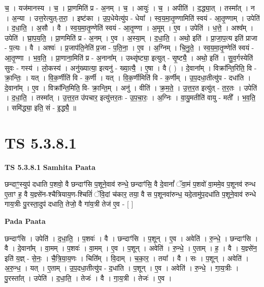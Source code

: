 \documentclass[17pt]{extarticle}
\begin{document}
च॒ । यज॑मानस्य । च॒ । प्रा॒णमिति॑ प्र - अ॒नम् । च॒ । आयुः॑ । च॒ । अपीति॑ । द॒द्ध्या॒त् । तस्मा᳚त् । न । अ॒न्या । उत्त॒रेत्युत्-त॒रा॒ । इष्ट॑का । उ॒प॒धेयेत्यु॑प - धेया᳚ । स्व॒य॒मा॒तृ॒ण्णामिति॑ स्वयं - आ॒तृ॒ण्णाम् । उपेति॑ । द॒धा॒ति॒ । अ॒सौ । वै । स्व॒य॒मा॒तृ॒ण्णेति॑ स्वयं - आ॒तृ॒ण्णा । अ॒मूम् । ए॒व । उपेति॑ । ध॒त्ते॒ । अश्व᳚म् । उपेति॑ । घ्रा॒प॒य॒ति॒ । प्रा॒णमिति॑ प्र - अ॒नम् । ए॒व । अ॒स्या॒म् । द॒धा॒ति॒ । अथो॒ इति॑ । प्रा॒जा॒प॒त्य इति॑ प्राजा - प॒त्यः । वै । अश्वः॑ । प्र॒जाप॑ति॒नेति॑ प्र॒जा - प॒ति॒ना॒ । ए॒व । अ॒ग्निम् । चि॒नु॒ते॒ । स्व॒य॒मा॒तृ॒ण्णेति॑ स्वयं - आ॒तृ॒ण्णा । भ॒व॒ति॒ । प्रा॒णाना॒मिति॑ प्र - अ॒नाना᳚म् । उथ्सृ॑ष्ट्या॒ इत्युत् - सृ॒ष्ट्यै॒ । अथो॒ इति॑ । सु॒व॒र्गस्येति॑ सुवः - गस्य॑ । लो॒कस्य॑ । अनु॑ख्यात्या॒ इत्यनु॑ - ख्या॒त्यै॒ । ए॒षा । वै ( ) । दे॒वाना᳚म् । विक्रा᳚न्ति॒रिति॒ वि - क्रा॒न्तिः॒ । यत् । वि॒क॒र्णीति॑ वि - क॒र्णी । यत् । वि॒क॒र्णीमिति॑ वि - क॒र्णीम् । उ॒प॒दधा॒तीत्यु॑प - दधा॑ति । दे॒वाना᳚म् । ए॒व । विक्रा᳚न्ति॒मिति॒ वि- क्रा॒न्ति॒म् । अनु॑ । वीति॑ । क्र॒म॒ते॒ । उ॒त्त॒र॒त इत्यु॑त् - त॒र॒तः । उपेति॑ । द॒धा॒ति॒ । तस्मा᳚त् । उ॒त्त॒र॒त उ॑पचार॒ इत्यु॑त्तर॒तः - उ॒प॒चा॒रः॒ । अ॒ग्निः । वा॒यु॒मतीति॑ वायु - मती᳚ । भ॒व॒ति॒ । समि॑द्ध्या॒ इति॒ सं - इ॒द्ध्यै॒ ॥  \newline




\section*{ TS 5.3.8.1 }

\textbf{TS 5.3.8.1 } \newline
\textbf{Samhita Paata} \newline

छन्दाꣳ॒॒स्युप॑ दधाति प॒शवो॒ वै छन्दाꣳ॑सि प॒शूने॒वाव॑ रुन्धे॒ छन्दाꣳ॑सि॒ वै दे॒वानां᳚ ॅवा॒मं प॒शवो॑ वा॒ममे॒व प॒शूनव॑ रुन्ध ए॒ताꣳ ह॒ वै य॒ज्ञ्से॑न-श्चैत्रियाय॒ण-श्चितिं॑ ॅवि॒दां च॑कार॒ तया॒ वै स प॒शूनवा॑रुन्ध॒ यदे॒तामु॑प॒दधा॑ति प॒शूने॒वाव॑ रुन्धे गाय॒त्रीः पु॒रस्ता॒दुप॑ दधाति॒ तेजो॒ वै गा॑य॒त्री तेज॑ ए॒व - [  ] \newline

\textbf{Pada Paata} \newline

छन्दाꣳ॑सि । उपेति॑ । द॒धा॒ति॒ । प॒शवः॑ । वै । छन्दाꣳ॑सि । प॒शून् । ए॒व । अवेति॑ । रु॒न्धे॒ । छन्दाꣳ॑सि । वै । दे॒वाना᳚म् । वा॒मम् । प॒शवः॑ । वा॒मम् । ए॒व । प॒शून् । अवेति॑ । रु॒न्धे॒ । ए॒ताम् । ह॒ । वै । य॒ज्ञ्से॑न॒ इति॑ य॒ज्ञ् - से॒नः॒ । चै॒त्रि॒या॒य॒णः । चिति᳚म् । वि॒दाम् । च॒का॒र॒ । तया᳚ । वै । सः । प॒शून् । अवेति॑ । अ॒रु॒न्ध॒ । यत् । ए॒ताम् । उ॒प॒दधा॒तीत्यु॑प - द॒धा॑ति । प॒शून् । ए॒व । अवेति॑ । रु॒न्धे॒ । गा॒य॒त्रीः । पु॒रस्ता᳚त् । उपेति॑ । द॒धा॒ति॒ । तेजः॑ । वै । गा॒य॒त्री । तेजः॑ । ए॒व ।  \newline
\end{document}
